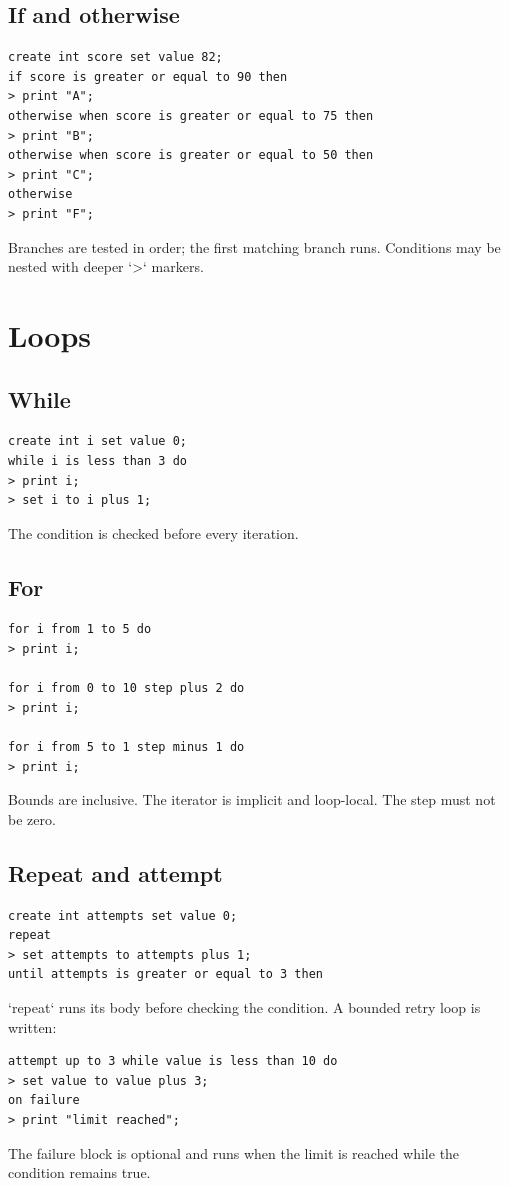 \documentclass[10.5pt,a4paper]{article}
\begin{document}
\subsection{If and otherwise}
\begin{lstlisting}
create int score set value 82;
if score is greater or equal to 90 then
> print "A";
otherwise when score is greater or equal to 75 then
> print "B";
otherwise when score is greater or equal to 50 then
> print "C";
otherwise
> print "F";
\end{lstlisting}
Branches are tested in order; the first matching branch runs. Conditions may be nested with deeper `>` markers.
\section{Loops}
\subsection{While}
\begin{lstlisting}
create int i set value 0;
while i is less than 3 do
> print i;
> set i to i plus 1;
\end{lstlisting}
The condition is checked before every iteration.
\subsection{For}
\begin{lstlisting}
for i from 1 to 5 do
> print i;

for i from 0 to 10 step plus 2 do
> print i;

for i from 5 to 1 step minus 1 do
> print i;
\end{lstlisting}
Bounds are inclusive. The iterator is implicit and loop-local. The step must not be zero.
\subsection{Repeat and attempt}
\begin{lstlisting}
create int attempts set value 0;
repeat
> set attempts to attempts plus 1;
until attempts is greater or equal to 3 then
\end{lstlisting}
`repeat` runs its body before checking the condition. A bounded retry loop is written:
\begin{lstlisting}
attempt up to 3 while value is less than 10 do
> set value to value plus 3;
on failure
> print "limit reached";
\end{lstlisting}
The failure block is optional and runs when the limit is reached while the condition remains true.
\end{document}
